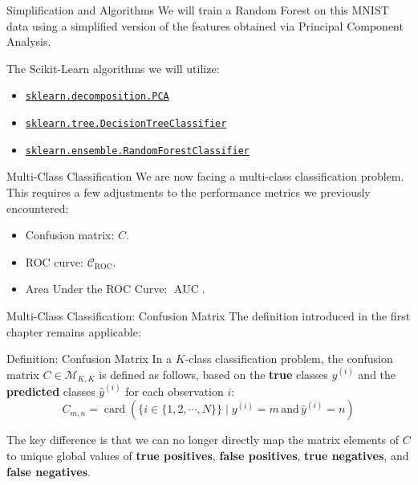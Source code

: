 \begin{frame}{Simplification and Algorithms}
	We will train a Random Forest on this MNIST data using a simplified version of the features obtained via Principal Component Analysis.
	
	\vspace{0.5cm}
	
	The Scikit-Learn algorithms we will utilize:
	\begin{itemize}
		\item \href{https://scikit-learn.org/stable/modules/generated/sklearn.decomposition.PCA.html}{\texttt{sklearn.decomposition.PCA}}
		\item \href{https://scikit-learn.org/stable/modules/generated/sklearn.tree.DecisionTreeClassifier.html}{\texttt{sklearn.tree.DecisionTreeClassifier}}
		\item \href{https://scikit-learn.org/stable/modules/generated/sklearn.ensemble.RandomForestClassifier.html}{\texttt{sklearn.ensemble.RandomForestClassifier}}
	\end{itemize}
\end{frame}

\begin{frame}{Multi-Class Classification}
	We are now facing a multi-class classification problem. This requires a few adjustments to the performance metrics we previously encountered:
	\begin{itemize}
		\item Confusion matrix: $C$.
		\item ROC curve: $\mathcal{C}_{\text{ROC}}$.
		\item Area Under the ROC Curve: $\operatorname{AUC}$.
	\end{itemize}
\end{frame}

\begin{frame}{Multi-Class Classification: Confusion Matrix}
	The definition introduced in the first chapter remains applicable:
	\begin{block}{Definition: Confusion Matrix}
		In a $K$-class classification problem, the confusion matrix $C \in \mathcal{M}_{K,K}$ is defined as follows, based on the \textbf{true} classes $y^{(i)}$ and the \textbf{predicted} classes $\hat{y}^{(i)}$ for each observation $i$:
		\begin{equation}
			C_{m,n} = \operatorname{card} \left( \{i \in \{1, 2, \cdots, N\}\} \mid y^{(i)} = m \, \text{and} \, \hat{y}^{(i)} = n \right)
			\nonumber
		\end{equation}
	\end{block}
	\vspace{0.5cm}
	\pause
	The key difference is that we can no longer directly map the matrix elements of $C$ to unique global values of \textbf{true positives}, \textbf{false positives}, \textbf{true negatives}, and \textbf{false negatives}.
\end{frame}

